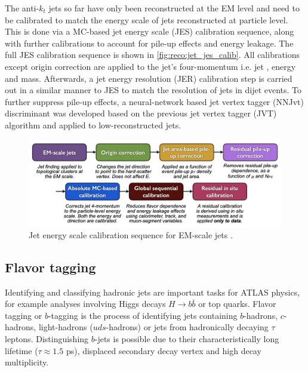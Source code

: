 \documentclass[../thesis.tex]{subfiles}
\begin{document}
The anti-$k_t$ jets so far have only been reconstructed at the \acs{EM} level and need to be calibrated to match the energy scale of jets reconstructed at particle level. This is done via a \acs{MC}-based jet energy scale (\acs{JES}) calibration sequence, along with further calibrations to account for pile-up effects and energy leakage. The full \acs{JES} calibration sequence is shown in \autoref{fig:reco:jet_jes_calib}. All calibrations except origin correction are applied to the jet's four-momentum i.e. jet \pT, energy and mass. Afterwards, a jet energy resolution (\acs{JER}) \citep{reco:jet_jer} calibration step is carried out in a similar manner to \acs{JES} to match the resolution of jets in dijet events.
To further suppress pile-up effects, a neural-network based jet vertex tagger (\acs{NNJvt}) discriminant was developed based on the previous jet vertex tagger (\acs{JVT}) algorithm \citep{reco:pileup} and applied to low-\pT reconstructed jets.

\begin{figure}[!htbp]
\begin{center}
\includegraphics[width=\linewidth]{fig/reco_jet_jes_calib.png}
\caption[Jet energy scale calibration sequence for EM-scale jets.]{\label{fig:reco:jet_jes_calib}Jet energy scale calibration sequence for \acs{EM}-scale jets \citep{reco:jet_jes}.}
\end{center}
\end{figure}


\subsection{Flavor tagging}
\label{sec:ftag}
Identifying and classifying hadronic jets are important tasks for ATLAS physics, for example analyses involving Higgs decays $H\rightarrow b\bar{b}$ or top quarks. Flavor tagging or $b$-tagging is the process of identifying jets containing $b$-hadrons, $c$-hadrons, light-hadrons ($uds$-hadrons) or jets from hadronically decaying $\tau$ leptons. Distinguishing $b$-jets is possible due to their characteristically long lifetime ($\tau\approx 1.5$ ps), displaced secondary decay vertex and high decay multiplicity.
\end{document}
